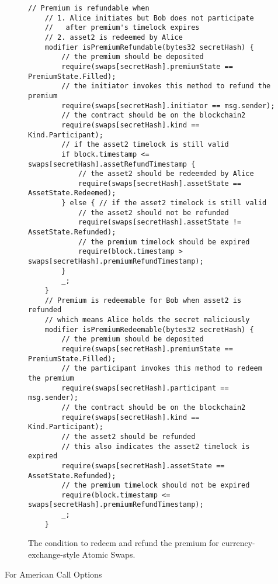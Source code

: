 \begin{figure}
    \begin{lstlisting}[language=Solidity, basicstyle=\tiny]
    // Premium is refundable when
    // 1. Alice initiates but Bob does not participate
    //   after premium's timelock expires
    // 2. asset2 is redeemed by Alice
    modifier isPremiumRefundable(bytes32 secretHash) {
        // the premium should be deposited
        require(swaps[secretHash].premiumState == PremiumState.Filled);
        // the initiator invokes this method to refund the premium
        require(swaps[secretHash].initiator == msg.sender);
        // the contract should be on the blockchain2
        require(swaps[secretHash].kind == Kind.Participant);
        // if the asset2 timelock is still valid
        if block.timestamp <= swaps[secretHash].assetRefundTimestamp {
            // the asset2 should be redeemded by Alice
            require(swaps[secretHash].assetState == AssetState.Redeemed);
        } else { // if the asset2 timelock is still valid
            // the asset2 should not be refunded
            require(swaps[secretHash].assetState != AssetState.Refunded);
            // the premium timelock should be expired
            require(block.timestamp > swaps[secretHash].premiumRefundTimestamp);
        }
        _;
    }
    // Premium is redeemable for Bob when asset2 is refunded
    // which means Alice holds the secret maliciously
    modifier isPremiumRedeemable(bytes32 secretHash) {
        // the premium should be deposited
        require(swaps[secretHash].premiumState == PremiumState.Filled);
        // the participant invokes this method to redeem the premium
        require(swaps[secretHash].participant == msg.sender);
        // the contract should be on the blockchain2
        require(swaps[secretHash].kind == Kind.Participant);
        // the asset2 should be refunded
        // this also indicates the asset2 timelock is expired
        require(swaps[secretHash].assetState == AssetState.Refunded);
        // the premium timelock should not be expired
        require(block.timestamp <= swaps[secretHash].premiumRefundTimestamp);
        _;
    }
    \end{lstlisting}
    \label{code:premium_condition_currency}
    \caption{The condition to redeem and refund the premium for currency-exchange-style Atomic Swaps.}
\end{figure}


For American Call Options

